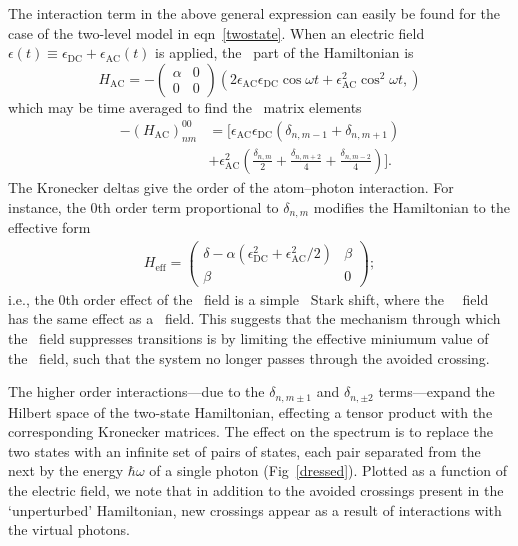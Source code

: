 The interaction term in the above general expression can easily be found for the
case of the two-level model in eqn~\ref{twostate}. When an electric field
$\epsilon(t)\equiv\epsilon_\text{DC}+\epsilon_\text{AC}(t)$ is applied, the \AC\
part of the Hamiltonian is
%
\[
H_\text{AC}=-\begin{pmatrix}\alpha&0\\0&0\end{pmatrix}
    \left(
    2\epsilon_\text{AC}\epsilon_\text{DC}\cos\omega t+\epsilon^2_\text{AC}\cos^2\omega t,
    \right)
\]
%
which may be time averaged to find the \AC\ matrix elements
%
\begin{align*}
-(H_\text{AC})^{00}_{nm}
&=\biggl[
    \epsilon_\text{AC}\epsilon_\text{DC}(\delta_{n,m-1}+\delta_{n,m+1})\\
    &+\epsilon^2_\text{AC}\left(
    \frac{\delta_{n,m}}{2}
    +\frac{\delta_{n,m+2}}{4}
    +\frac{\delta_{n,m-2}}{4}
    \right)
    \biggr].
\end{align*}
%
The Kronecker deltas give the order of the atom--photon interaction. For
instance, the 0th order term proportional to $\delta_{n,m}$ modifies the
Hamiltonian to the effective form
%
\begin{align*}
    H_\text{eff}=\begin{pmatrix}
        \delta-\alpha\left(\epsilon_\text{DC}^2+\epsilon_\text{AC}^2/2\right)&\beta\\
        \beta&0
    \end{pmatrix};
\end{align*}
%
i.e., the 0th order effect of the \AC\ field is a simple \AC\ Stark shift, where
the \RMS\ \AC\ field has the same effect as a \DC\ field. This suggests that the
mechanism through which the \AC\ field suppresses transitions is by limiting the
effective miniumum value of the \DC\ field, such that the system no longer
passes through the avoided crossing.

The higher order interactions---due to the $\delta_{n,m\pm1}$ and
$\delta_{n,\pm2}$ terms---expand the Hilbert space of the two-state Hamiltonian,
effecting a tensor product with the corresponding Kronecker matrices. The effect
on the spectrum is to replace the two states with an infinite set of pairs of
states, each pair separated from the next by the energy $\hbar\omega$ of a
single photon (Fig~\ref{dressed}). Plotted as a function of the electric field,
we note that in addition to the avoided crossings present in the `unperturbed'
Hamiltonian, new crossings appear as a result of interactions with the virtual
photons.

